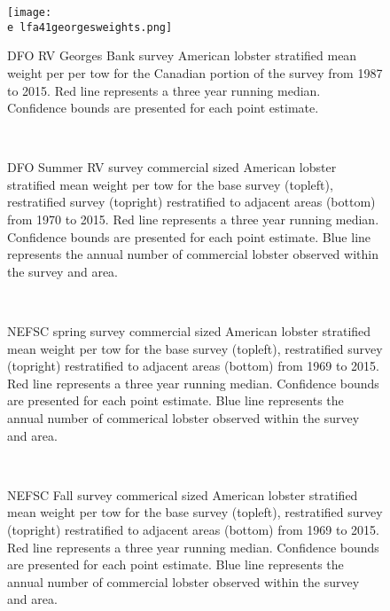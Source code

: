 \documentclass[11pt]{article}
\newcommand{\e}{/backup/bio_data/bio.lobster/figures/} %
\begin{document}
\begin{figure}

    \texttt{[image: \\e lfa41georgesweights.png]}
    \caption{DFO RV Georges Bank survey American lobster stratified mean weight per per tow for the Canadian portion of the survey from 1987 to 2015. Red line represents a three year running median. Confidence bounds are presented for each point estimate.}

\end{figure}

\begin{figure}
\centering
{}
\\
\caption{DFO Summer RV survey commercial sized American lobster stratified mean weight per tow for the base survey (topleft), restratified survey (topright) restratified to adjacent areas (bottom) from 1970 to 2015. Red line represents a three year running median. Confidence bounds are presented for each point estimate. Blue line represents the annual number of commercial lobster observed within the survey and area.}
\end{figure}
\clearpage

\begin{figure}
\centering
{}
\\
\caption{NEFSC spring survey commercial sized American lobster stratified mean weight per tow for the base survey (topleft), restratified survey (topright) restratified to adjacent areas (bottom) from 1969 to 2015. Red line represents a three year running median. Confidence bounds are presented for each point estimate. Blue line represents the annual number of commerical lobster observed within the survey and area.}
\end{figure}
\clearpage


\begin{figure}
\centering
{}
\\
\caption{NEFSC Fall survey commerical sized American lobster stratified mean weight per tow for the base survey (topleft), restratified survey (topright) restratified to adjacent areas (bottom) from 1969 to 2015. Red line represents a three year running median. Confidence bounds are presented for each point estimate. Blue line represents the annual number of commercial lobster observed within the survey and area.}
\end{figure}
\clearpage
\end{document}
